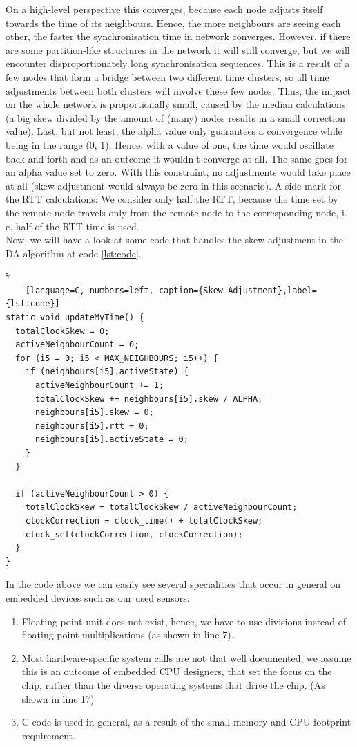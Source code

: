 \documentclass{llncs}
\begin{document}
\noindent On a high-level perspective this converges, because each node adjusts itself towards the time of its neighbours. Hence, the more neighbours are seeing each other, the faster the synchronisation time in network converges. However, if there are some partition-like structures in the network it will still converge, but we will encounter disproportionately long synchronisation sequences. This is a result of a few nodes that form a bridge between two different time clusters, so all time adjustments between both clusters will involve these few nodes. Thus, the impact on the whole network is proportionally small, caused by the median calculations (a big skew divided by the amount of (many) nodes results in a small correction value). Last, but not least, the alpha value only guarantees a convergence while being in the range (0, 1). Hence, with a value of one, the time would oscillate back and forth and as an outcome it wouldn't converge at all. The same goes for an alpha value set to zero. With this constraint, no adjustments would take place at all (skew adjustment would always be zero in this scenario).
\bigbreak
\noindent A side mark for the RTT calculations: We consider only half the RTT, because the time set by the remote node travels only from the remote node to the corresponding node, i. e. half of the RTT time is used.\\
Now, we will have a look at some code that handles the skew adjustment in the DA-algorithm at code \ref{lst:code}.

\begin{lstlisting}%
	[language=C, numbers=left, caption={Skew Adjustment},label={lst:code}]
static void updateMyTime() {
  totalClockSkew = 0;
  activeNeighbourCount = 0;
  for (i5 = 0; i5 < MAX_NEIGHBOURS; i5++) {
    if (neighbours[i5].activeState) {
      activeNeighbourCount += 1;
      totalClockSkew += neighbours[i5].skew / ALPHA;
      neighbours[i5].skew = 0;
      neighbours[i5].rtt = 0;
      neighbours[i5].activeState = 0;
    }
  }

  if (activeNeighbourCount > 0) {
    totalClockSkew = totalClockSkew / activeNeighbourCount;
    clockCorrection = clock_time() + totalClockSkew;
    clock_set(clockCorrection, clockCorrection);
  }
}
\end{lstlisting}
\noindent In the code above we can easily see several specialities that occur in general on embedded devices such as our used sensors:
\begin{enumerate}
\item Floating-point unit does not exist, hence, we have to use divisions instead of floating-point multiplications (as shown in line 7).
\item Most hardware-specific system calls are not that well documented, we assume this is an outcome of embedded CPU designers, that set the focus on the chip, rather than the diverse operating systems that drive the chip. (As shown in line 17)
\item C code is used in general, as a result of the small memory and CPU footprint requirement.
\end{enumerate}
\end{document}
